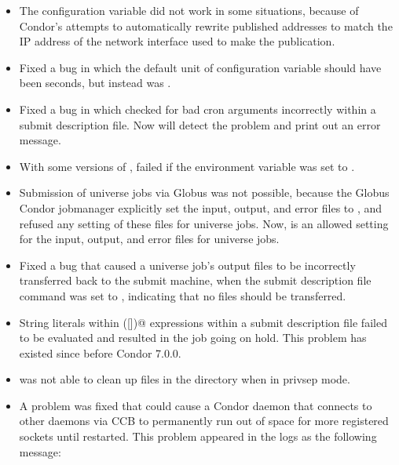 \begin{itemize}
\item The configuration variable  did not
work in some situations, because of Condor's attempts to
automatically rewrite published addresses to match the IP address of
the network interface used to make the publication.

\item Fixed a bug in which the default unit of configuration variable
should have been seconds, but instead was .

\item Fixed a bug in which  checked for bad  cron 
 arguments incorrectly within a submit description file.
 Now  will detect the problem and print out an error message.

\item With some versions of ,  failed if
the  environment variable was set to .

\item Submission of  universe jobs via Globus was not possible,
because the Globus Condor jobmanager explicitly set the input, output,
and error files to ,
and  refused any setting of these files for
 universe jobs.  
Now,  is an allowed setting for the input, output,
and error files for  universe jobs.

\item Fixed a bug that caused a  universe job's output files
to be incorrectly transferred back to the submit machine, 
when the submit description file command 
was set to ,
indicating that no files should be transferred.

\item String literals within \verb@$$([])@ expressions within a submit
description file failed to be evaluated and resulted in the job going on hold.
This problem has existed since before Condor 7.0.0.

\item {} was not able to clean up files in the 
directory when in privsep mode.

\item A problem was fixed that could cause a Condor daemon that
  connects to other daemons via CCB to permanently run out of space
  for more registered sockets until restarted.  This problem appeared
  in the logs as the following message:


\end{itemize}
